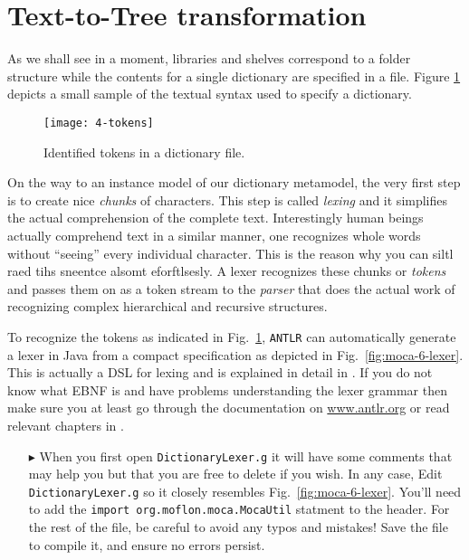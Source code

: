 \newpage
\section{Text-to-Tree transformation}
\genHeader

As we shall see in a moment, libraries and shelves correspond to a folder structure while the contents for a single dictionary are specified in a file.
Figure \ref{fig:moca-4-Tokens} depicts a small sample of the textual syntax used to specify a dictionary. 

\begin{figure}[!htbp]
\begin{center}
 \texttt{[image: 4-tokens]}
  \caption{Identified tokens in a dictionary file.}
  \label{fig:moca-4-Tokens}
\end{center}
\end{figure}

On the way to an instance model of our dictionary metamodel, the very first step is to create nice \emph{chunks} of characters. This step is called
\emph{lexing} and it simplifies the actual comprehension of the complete text. Interestingly human beings actually comprehend text in a similar manner, one
recognizes whole words without ``seeing'' every individual character. This is the reason why you can siltl raed tihs sneentce alsomt eforftlsesly. A lexer
recognizes these chunks or \emph{tokens} and passes them on as a token stream to the \emph{parser} that does the actual work of recognizing complex
hierarchical and recursive structures.
   
To recognize the tokens as indicated in Fig.~\ref{fig:moca-4-Tokens}, \texttt{ANTLR} can automatically generate a lexer in Java from a compact specification as
depicted in Fig.~\ref{fig:moca-6-lexer}. This is actually a DSL for lexing and is explained in detail in \cite{ANTLR}. If you do not know what EBNF is and have
problems understanding the lexer grammar then make sure you at least go through the documentation on \url{www.antlr.org} or read relevant chapters in
\cite{ANTLR}.

\begin{itemize}
  
\item[$\blacktriangleright$] When you first open \texttt{DictionaryLexer.g} it will have some comments that may help you but that you are free to delete if you
wish. In any case, Edit \texttt{DictionaryLexer.g} so it closely resembles Fig.~\ref{fig:moca-6-lexer}. You'll need to add the \texttt{import
org.moflon.moca.MocaUtil} statment to the header. For the rest of the file, be careful to avoid any typos and mistakes! Save the file to compile it, and ensure
no errors persist.

\end{itemize}
\newpage

